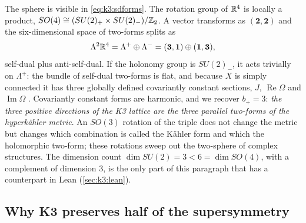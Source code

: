 The sphere is visible in \eqref{eq:k3:sdforms}. The rotation group of $\mathbb{R}^4$ is locally a
product, $SO(4)\cong(SU(2)_+\times SU(2)_-)/\mathbb{Z}_2$. A vector transforms as $(\mathbf2,\mathbf2)$
and the six-dimensional space of two-forms splits as
\begin{equation}\label{eq:k3:twoforms}
  \Lambda^2\mathbb{R}^4=\Lambda^+\oplus\Lambda^-=(\mathbf3,\mathbf1)\oplus(\mathbf1,\mathbf3),
\end{equation}
self-dual plus anti-self-dual. If the holonomy group is $SU(2)_-$, it acts trivially on
$\Lambda^+$: the bundle of self-dual two-forms is flat, and because $X$ is simply connected it
has three globally defined covariantly constant sections, $J$, $\operatorname{Re}\Omega$ and
$\operatorname{Im}\Omega$ . Covariantly constant forms are
harmonic, and we recover $b_+=3$: \emph{the three positive directions of the K3 lattice are
the three parallel two-forms of the hyperkähler metric}. An $SO(3)$ rotation of the triple
does not change the metric but changes which combination is called the Kähler form and which
the holomorphic two-form; these rotations sweep out the two-sphere of complex structures.
The dimension count $\dim SU(2)=3<6=\dim SO(4)$, with a complement of dimension $3$, is the
only part of this paragraph that has a counterpart in Lean (\cref{sec:k3:lean}).

\subsection{Why K3 preserves half of the supersymmetry}

